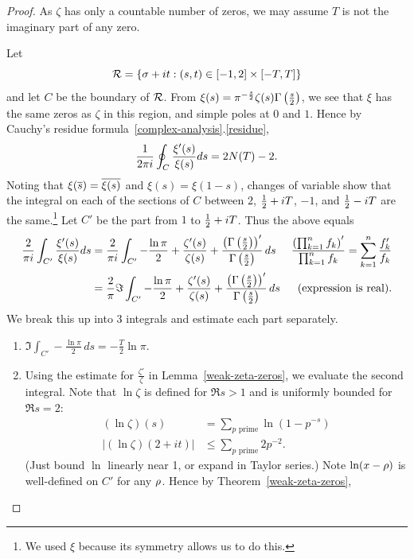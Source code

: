 \begin{proof}
As $\zeta$ has only a countable number of zeros, we may assume $T$ is not the imaginary part of any zero.

Let
\[
\cal R=\set{\si+it}{(s,t)\in [-1,2]\times [-T,T]}
\]
and let $C$ be the boundary of $\cal R$. 
From $\xi(s)=\pi^{-\frac s2}\zeta(s)\Ga\pf s2$, we see that $\xi$ has the same zeros as $\zeta$ in this region, and simple poles at $0$ and $1$. %
Hence by Cauchy's residue formula~\ref{complex-analysis}.\ref{residue},
\[
\rc{2\pi i}\oint_{C} \frac{\xi'(s)}{\xi(s)} ds=2N(T)-2.
\]
Noting that $\xi(\ol{s})=\ol{\xi(s)}$ and $\xi(s)=\xi(1-s)$, changes of variable show that the integral on each of the sections of $C$ between $2$, $\rc 2+iT$, $-1$, and $\rc 2-iT$ are the same.\footnote{We used $\xi$ because its symmetry allows us to do this.} Let $C'$ be the part from $1$ to $\rc 2+iT$. Thus 
the above equals
\begin{align*}
\frac2{\pi i}\int_{C'} \frac{\xi'(s)}{\xi(s)} ds
&=\frac2{\pi i}
\int_{C'} -\frac{\ln \pi}{2}+\frac{\zeta'(s)}{\zeta(s)}+\frac{\pa{\Ga\pf{s}{2}}'}{\Ga\pf s2}\,ds&\frac{\pa{\prod_{k=1}^n f_k}'}{\prod_{k=1}^n f_k}=\sum_{k=1}^n \frac{f_k'}{f_k}\\
&=\frac2{\pi}\Im
\int_{C'} -\frac{\ln \pi}{2}+\frac{\zeta'(s)}{\zeta(s)}+\frac{\pa{\Ga\pf{s}{2}}'}{\Ga\pf s2}\,ds
&\text{(expression is real)}.
\end{align*}
We break this up into 3 integrals and estimate each part separately.
\begin{enumerate}
\item $\Im\int_{C'}-\frac{\ln \pi}{2}\,ds=-\frac{T}{2}\ln \pi$.
\item Using the estimate for $\frac{\zeta'}{\zeta}$ in Lemma~\ref{weak-zeta-zeros},  we evaluate the second integral. Note that $\ln\zeta$ is defined for $\Re s> 1$ and is uniformly bounded for $\Re s=2$:
\begin{align*}
(\ln\zeta)(s)&=\sum_{p\text{ prime}} \ln(1-p^{-s}) \\
|(\ln\zeta)(2+it)|&\le\sum_{p\text{ prime}} 2p^{-2}.
\end{align*}
(Just bound $\ln$ linearly near 1, or expand in Taylor series.)  
Note $\ln(x-\rh)$ is well-defined on $C'$ for any $\rh$. Hence by Theorem~\ref{weak-zeta-zeros},

\end{enumerate}
\end{proof}
